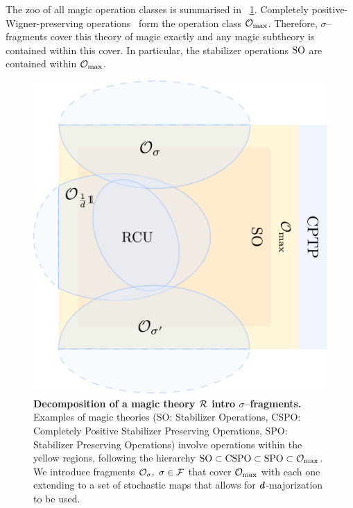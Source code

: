 \documentclass[pra,
aps,
twocolumn,
superscriptaddress,
groupedaddress,
nofootinbib,
reprint
]{revtex4-1}
\begin{document}
The zoo of all magic operation classes is summarised in ~\cref{fig:zoo}.
Completely positive-Wigner-preserving operations~\cite{cit:wang} form the operation class $\mathcal{O}_{\rm{}max}$.
Therefore, $\sigma$--fragments cover this theory of magic exactly and any magic subtheory is contained within this cover.
In particular, the stabilizer operations ${\rm{SO}}$ are contained within $\mathcal{O}_{\rm{}max}$.
\begin{figure}[t]
    \centering
        \includegraphics[scale=0.47
        ]{figs/operations.pdf}
    \caption{\textbf{Decomposition of a magic theory $\mathcal{R}$ intro $\sigma$--fragments.} 
    Examples of magic theories (SO: Stabilizer Operations, CSPO: Completely Positive Stabilizer Preserving Operations, SPO: Stabilizer Preserving Operations) involve operations within the yellow regions, following the hierarchy ${\rm{SO}} \subset {\rm{CSPO}} \subset {\rm{SPO}} \subset \mathcal{O}_{\rm{}max}$.
    We introduce fragments $\mathcal{O}_\sigma,\ \sigma \in \mathcal{F}$ that cover $\mathcal{O}_{\rm{}max}$ with each one extending to a set of stochastic maps that allows for $\bm{d}$-majorization to be used. 
    }
    \label{fig:zoo}
\end{figure}
\end{document}
